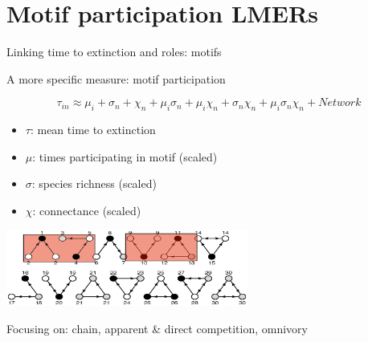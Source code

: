 \documentclass{beamer}
\begin{document}






\section*{Motif participation LMERs}

  \begin{frame}{Linking time to extinction and roles: motifs}

    A more specific measure: motif participation

    \vspace{-0.4cm}
    {\color{DarkBlue}
    \begin{equation*}
    \tau_{in} \approx \mu_i + \sigma_n + \chi_n + \mu_{i}\sigma_{n} + \mu_{i}\chi_{n} + \sigma_{n}\chi_{n} + \mu_{i}\sigma_{n}\chi_{n} + Network
    \end{equation*}
    }
    \vspace{-0.4cm}
    \begin{itemize}
      \item $\tau$: mean time to extinction
      \item $\mu$: times participating in motif (scaled)
      \item $\sigma$: species richness (scaled)
      \item $\chi$: connectance (scaled)
    \end{itemize}

    \begin{centering}

      \includegraphics[height=2.5cm]{intro_figs/stable_motifs_and_positions.eps}

    \end{centering}

    {\color{white}Focusing on: chain, apparent \& direct competition, omnivory}


    \end{frame}
\end{document}
